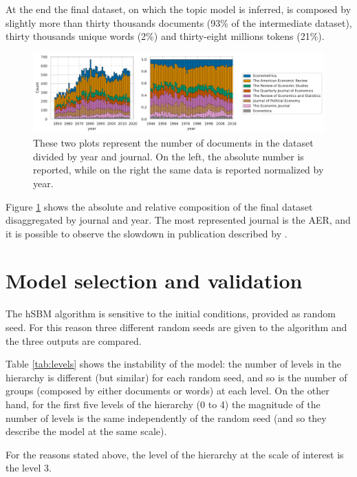 \documentclass[a4paper, 11pt, headings=standardclasses, tablecaptionsbelow]{scrartcl}
\begin{document}
At the end the final dataset, on which the topic model is inferred, is composed by slightly more than thirty thousands documents (93\% of the intermediate dataset), thirty thousands unique words (2\%) and thirty-eight millions tokens (21\%).

\begin{figure}[tb]
  \centering
  \includegraphics[width=\textwidth]{src/journals.pdf}
  \caption[Number of documents per journal and year]{These two plots represent the number of documents in the dataset divided by year and journal. On the left, the absolute number is reported, while on the right the same data is reported normalized by year.}
  \label{fig:journals}
\end{figure}

Figure \ref{fig:journals} shows the absolute and relative composition of the final dataset disaggregated by journal and year.
The most represented journal is the AER, and it is possible to observe the slowdown in publication described by \textcite{ellison2003,card2013}.

\section{Model selection and validation}
The hSBM algorithm is sensitive to the initial conditions, provided as random seed. For this reason three different random seeds are given to the algorithm and the three outputs are compared.



Table \ref{tab:levels} shows the instability of the model: the number of levels in the hierarchy is different (but similar) for each random seed, and so is the number of groups (composed by either documents or words) at each level.
On the other hand, for the first five levels of the hierarchy (0 to 4) the magnitude of the number of levels is the same independently of the random seed (and so they describe the model at the same scale).

For the reasons stated above, the level of the hierarchy at the scale of interest is the level 3.
\end{document}
